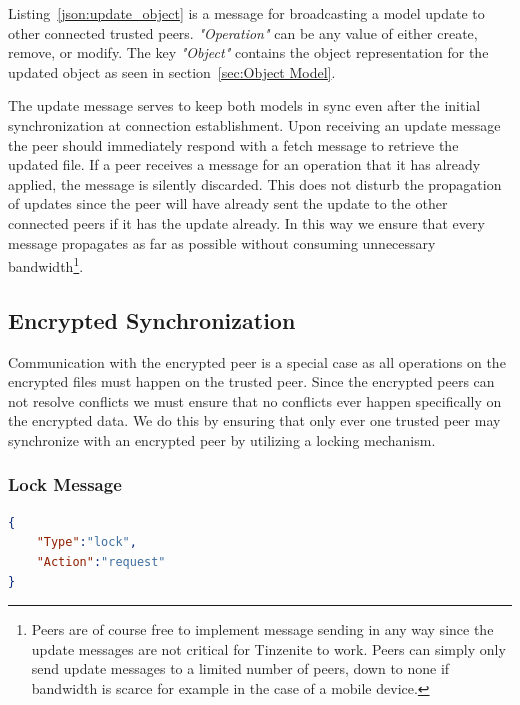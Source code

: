 Listing~\ref{json:update_object} is a message for broadcasting a model update to other connected trusted peers.
\textit{"Operation"} can be any value of either create, remove, or modify.
The key \textit{"Object"} contains the object representation for the updated object as seen in section~\ref{sec:Object Model}.

The update message serves to keep both models in sync even after the initial synchronization at connection establishment.
Upon receiving an update message the peer should immediately respond with a fetch message to retrieve the updated file.
If a peer receives a message for an operation that it has already applied, the message is silently discarded.
This does not disturb the propagation of updates since the peer will have already sent the update to the other connected peers if it has the update already.
In this way we ensure that every message propagates as far as possible without consuming unnecessary bandwidth\footnote{Peers are of course free to implement message sending in any way since the update messages are not critical for Tinzenite to work. Peers can simply only send update messages to a limited number of peers, down to none if bandwidth is scarce for example in the case of a mobile device.}.

\subsection{Encrypted Synchronization}
\label{sub:Encrypted Synchronization}

Communication with the encrypted peer is a special case as all operations on the encrypted files must happen on the trusted peer.
Since the encrypted peers can not resolve conflicts we must ensure that no conflicts ever happen specifically on the encrypted data.
We do this by ensuring that only ever one trusted peer may synchronize with an encrypted peer by utilizing a locking mechanism.

\subsubsection{Lock Message}
\label{subs:Lock Message}

\begin{listing}[htp]
    \begin{lstlisting}[language=json,firstnumber=0]
{
    "Type":"lock",
    "Action":"request"
}
    \end{lstlisting}
\caption[Lock Peer Message]{Message for negotiating a lock for a peer.}
\label{json:lock_peer}
\end{listing}

